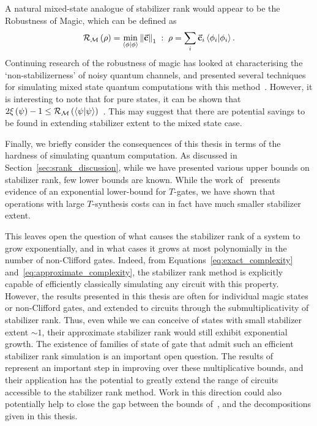 A natural mixed-state analogue of stabilizer rank would appear to be the Robustness of Magic, which can be defined as~\cite{Howard2017}
\begin{equation}
\mathcal{R}_{\mathcal{M}}\left(\rho\right) = \min_{\braket{\phi}} \norm{\va{c}}_{1}\;:\; \rho = \sum_{i}\va{c}_{i}\braket{\phi_{i}}.
\end{equation}
Continuing research of the robustness of magic has looked at characterising the `non-stabilizerness' of noisy quantum channels, and presented several techniques for simulating mixed state quantum computations with this method~\cite{Seddon2019}. However, it is interesting to note that for pure states, it can be shown that $2 \xi\left(\psi\right) -1 \leq \mathcal{R}_{\mathcal{M}}\left(\braket{\psi}\right)$~\cite{Regula2018}. This may suggest that there are potential savings to be found in extending stabilizer extent to the mixed state case.\par
Finally, we briefly consider the consequences of this thesis in terms of the hardness of simulating quantum computation. As discussed in Section~\ref{sec:srank_discussion}, while we have presented various upper bounds on stabilizer rank, few lower bounds are known. While the work of~\cite{Dalzell2017} presents evidence of an exponential lower-bound for $T$-gates, we have shown that operations with large $T$-synthesis costs can in fact have much smaller stabilizer extent.\par
This leaves open the question of what causes the stabilizer rank of a system to grow exponentially, and in what cases it grows at most polynomially in the number of non-Clifford gates. Indeed, from Equations~\ref{eq:exact_complexity} and~\ref{eq:approximate_complexity}, the stabilizer rank method is explicitly capable of efficiently classically simulating any circuit with this property. However, the results presented in this thesis are often for individual magic states or non-Clifford gates, and extended to circuits through the submultiplicativity of stabilizer rank. Thus, even while we can conceive of states with small stabilizer extent $\sim 1$, their approximate stabilizer rank would still exhibit exponential growth. The existence of families of state of gate that admit such an efficient stabilizer rank simulation is an important open question. The results of~\cite{Qassim2019} represent an important step in improving over these multiplicative bounds, and their application has the potential to greatly extend the range of circuits accessible to the stabilizer rank method. Work in this direction could also potentially help to close the gap between the bounds of~\cite{Dalzell2017}, and the decompositions given in this thesis.